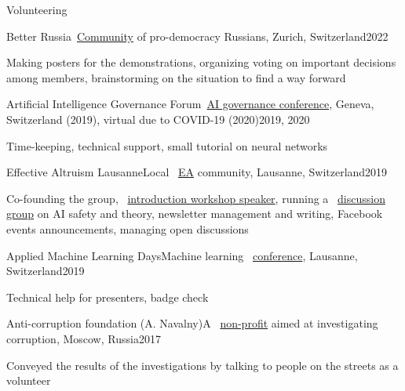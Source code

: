 \documentclass{resume} %
\newcommand{\mylink}{{\color{gray}\faExternalLink}}
\begin{document}
\begin{rSection}{Volunteering}
\begin{rSubsection}{Better Russia}{}{\mylink~\href{https://betterrussia.org}{Community} of pro-democracy Russians, Zurich, Switzerland}{2022}
	\item[] Making posters for the demonstrations, organizing voting on important decisions among members, brainstorming on the situation to find a way forward
\end{rSubsection}
	
\begin{rSubsection}{Artificial Intelligence Governance Forum}{}{\mylink~\href{https://ai-gf.com/}{AI governance conference}, Geneva, Switzerland (2019), virtual due to COVID-19 (2020)}{2019, 2020}
	\item[] Time-keeping, technical support, small tutorial on neural networks
\end{rSubsection}
	
\begin{rSubsection}{Effective Altruism Lausanne}{}{Local \mylink~\href{https://effectivealtruism.org}{EA} community, Lausanne, Switzerland}{2019}
	\item[] Co-founding the group, \mylink~\href{https://web.archive.org/web/20200128171213/https://eageneva.org/about}{introduction workshop speaker}, running a \mylink~\href{https://docs.google.com/document/d/1prejPACr08nUVztHRBc4nj4upKtDc9_EJOYi1alWuYM/edit?usp=sharing}{discussion group} on AI safety and theory, newsletter management and writing, Facebook events announcements, managing open discussions
\end{rSubsection}

\begin{rSubsection}{Applied Machine Learning Days}{}{Machine learning \mylink~\href{https://www.appliedmldays.org/}{conference}, Lausanne, Switzerland}{2019}
\item[]	Technical help for presenters, badge check
\end{rSubsection}

\begin{rSubsection}{Anti-corruption foundation (A. Navalny)}{}{A \mylink~\href{https://en.wikipedia.org/wiki/Anti-Corruption_Foundation}{non-profit} aimed at investigating corruption, Moscow, Russia}{2017}
\item[] Conveyed the results of the investigations by talking to people on the streets as a volunteer
\end{rSubsection}
\end{rSection}
\end{document}
